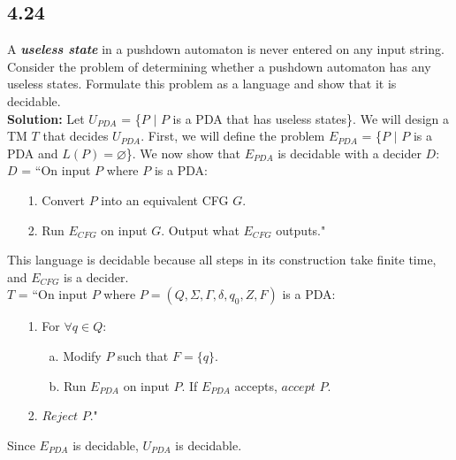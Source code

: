 \subsection*{4.24} A \emph{\textbf{useless state}} in a pushdown automaton is never entered on any input string. Consider the problem of determining whether a pushdown automaton has any useless states. Formulate this problem as a language and show that it is decidable.
\\
\textbf{Solution:} Let $U_{PDA}$ = \{\textlangle{}$P$\textrangle{} $|$ $P$ is a PDA that has useless states\}. We will design a TM $T$ that decides $U_{PDA}$. First, we will define the problem $E_{PDA}$ = \{\textlangle{}$P$\textrangle{} $|$ $P$ is a PDA and $L(P) = \varnothing$\}. We now show that $E_{PDA}$ is decidable with a decider $D$:
\\
$D$ = ``On input \textlangle{}$P$\textrangle{} where $P$ is a PDA:
\begin{enumerate}
\itemsep0em
\item[1.]Convert $P$ into an equivalent CFG $G$.
\item[2.]Run $E_{CFG}$ on input \textlangle{}$G$\textrangle{}. Output what $E_{CFG}$ outputs."
\end{enumerate}
This language is decidable because all steps in its construction take finite time, and $E_{CFG}$ is a decider.
\\
$T$ = ``On input \textlangle{}$P$\textrangle{} where $P = (Q, \Sigma, \Gamma, \delta, q_0, Z, F)$ is a PDA:
\begin{enumerate}
\itemsep0em
\item[1.]For $\forall q \in Q$:
\begin{enumerate}
\item[a.]Modify $P$ such that $F = \{q\}$.
\item[b.]Run $E_{PDA}$ on input \textlangle{}$P$\textrangle{}. If $E_{PDA}$ accepts, $accept$ \textlangle{}$P$\textrangle{}.
\end{enumerate}
\item[2.]$Reject$ \textlangle{}$P$\textrangle{}."
\end{enumerate}
Since $E_{PDA}$ is decidable, $U_{PDA}$ is decidable.